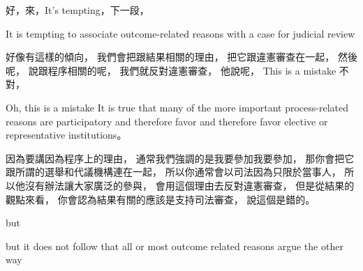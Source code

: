 \hypertarget{w06:cue:2316}{}好，來，It's tempting，下一段，

\hypertarget{w06:cue:2317}{}It is tempting to associate outcome-related reasons with a case for judicial review

\hypertarget{w06:cue:2318}{}好像有這樣的傾向，
\hypertarget{w06:cue:2319}{}我們會把跟結果相關的理由，
\hypertarget{w06:cue:2320}{}把它跟違憲審查在一起，
\hypertarget{w06:cue:2321}{}然後呢，
\hypertarget{w06:cue:2322}{}說跟程序相關的呢，
\hypertarget{w06:cue:2323}{}我們就反對違憲審查，
\hypertarget{w06:cue:2324}{}他說呢，
\hypertarget{w06:cue:2325}{}This is a mistake
\hypertarget{w06:cue:2326}{}不對，

\hypertarget{w06:cue:2327}{}Oh, this is a mistake
\hypertarget{w06:cue:2328}{}It is true that many of the more important process-related reasons
\hypertarget{w06:cue:2329}{}are participatory and therefore favor
\hypertarget{w06:cue:2330}{}and therefore favor elective or representative institutions。

\hypertarget{w06:cue:2331}{}因為要講因為程序上的理由，
\hypertarget{w06:cue:2332}{}通常我們強調的是我要參加我要參加，
\hypertarget{w06:cue:2333}{}那你會把它跟所謂的選舉和代議機構連在一起，
\hypertarget{w06:cue:2334}{}所以你通常會以司法因為只限於當事人，
\hypertarget{w06:cue:2335}{}所以他沒有辦法讓大家廣泛的參與，
\hypertarget{w06:cue:2336}{}會用這個理由去反對違憲審查，
\hypertarget{w06:cue:2337}{}但是從結果的觀點來看，
\hypertarget{w06:cue:2338}{}你會認為結果有關的應該是支持司法審查，
\hypertarget{w06:cue:2339}{}說這個是錯的。

\hypertarget{w06:cue:2340}{}but

\hypertarget{w06:cue:2341}{}but it does not follow that all or most outcome related reasons argue the other way

